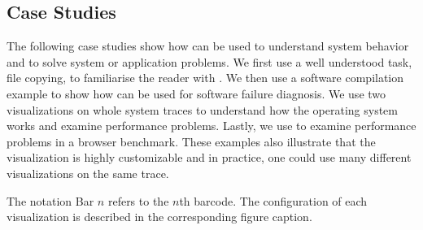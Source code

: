 \subsection{Case Studies}
\label{sec:study}

The following case studies show how \lviz{} can be used to
understand system behavior and to solve system or application problems.
We first use a well understood task, file copying,
to familiarise the reader with \VDP{}.
We then use a software compilation example to show how \VDP{} can
be used for software failure diagnosis.
We use two visualizations on whole system traces to understand
how the operating system works and examine performance problems.
Lastly, we use \VDP{} to examine performance problems in a browser benchmark.
These examples also illustrate that the \VDP{} visualization is highly
customizable and in practice, one could use many different visualizations
on the same trace.


The notation Bar $n$ refers to the $n$th barcode.
The configuration of each visualization is described in the corresponding
figure caption.





%

%
%
